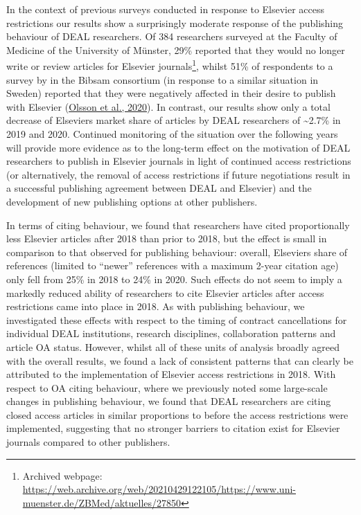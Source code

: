 \documentclass[
]{article}
\begin{document}
In the context of previous surveys conducted in response to Elsevier access restrictions our results show a surprisingly moderate response of the publishing behaviour of DEAL researchers. Of 384 researchers surveyed at the Faculty of Medicine of the University of Münster, 29\% reported that they would no longer write or review articles for Elsevier journals\footnote{Archived webpage: \url{https://web.archive.org/web/20210429122105/https://www.uni-muenster.de/ZBMed/aktuelles/27850}}, whilst 51\% of respondents to a survey by in the Bibsam consortium (in response to a similar situation in Sweden) reported that they were negatively affected in their desire to publish with Elsevier (\href{http://doi.org/10.1629/uksg.507}{Olsson et al., 2020}). In contrast, our results show only a total decrease of Elsevier\textquotesingle s market share of articles by DEAL researchers of \textasciitilde2.7\% in 2019 and 2020. Continued monitoring of the situation over the following years will provide more evidence as to the long-term effect on the motivation of DEAL researchers to publish in Elsevier journals in light of continued access restrictions (or alternatively, the removal of access restrictions if future negotiations result in a successful publishing agreement between DEAL and Elsevier) and the development of new publishing options at other publishers.

In terms of citing behaviour, we found that researchers have cited proportionally less Elsevier articles after 2018 than prior to 2018, but the effect is small in comparison to that observed for publishing behaviour: overall, Elsevier\textquotesingle s share of references (limited to ``newer'' references with a maximum 2-year citation age) only fell from 25\% in 2018 to 24\% in 2020. Such effects do not seem to imply a markedly reduced ability of researchers to cite Elsevier articles after access restrictions came into place in 2018. As with publishing behaviour, we investigated these effects with respect to the timing of contract cancellations for individual DEAL institutions, research disciplines, collaboration patterns and article OA status. However, whilst all of these units of analysis broadly agreed with the overall results, we found a lack of consistent patterns that can clearly be attributed to the implementation of Elsevier access restrictions in 2018. With respect to OA citing behaviour, where we previously noted some large-scale changes in publishing behaviour, we found that DEAL researchers are citing closed access articles in similar proportions to before the access restrictions were implemented, suggesting that no stronger barriers to citation exist for Elsevier journals compared to other publishers.
\end{document}
